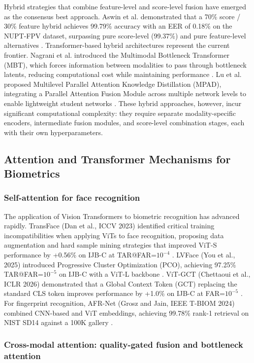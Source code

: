 \documentclass[10pt,journal,compsoc]{IEEEtran}
\begin{document}
Hybrid strategies that combine feature-level and score-level fusion have emerged as the consensus best approach. Aswin et al. demonstrated that a 70\% score / 30\% feature hybrid achieves 99.79\% accuracy with an EER of 0.18\% on the NUPT-FPV dataset, surpassing pure score-level (99.37\%) and pure feature-level alternatives \cite{REF3}. Transformer-based hybrid architectures represent the current frontier. Nagrani et al. introduced the Multimodal Bottleneck Transformer (MBT), which forces information between modalities to pass through bottleneck latents, reducing computational cost while maintaining performance \cite{REF106}. Lu et al. proposed Multilevel Parallel Attention Knowledge Distillation (MPAD), integrating a Parallel Attention Fusion Module across multiple network levels to enable lightweight student networks \cite{REF54}. These hybrid approaches, however, incur significant computational complexity: they require separate modality-specific encoders, intermediate fusion modules, and score-level combination stages, each with their own hyperparameters.

\subsection{Attention and Transformer Mechanisms for Biometrics}

\subsubsection{Self-attention for face recognition}

The application of Vision Transformers to biometric recognition has advanced rapidly. TransFace (Dan et al., ICCV 2023) identified critical training incompatibilities when applying ViTs to face recognition, proposing data augmentation and hard sample mining strategies that improved ViT-S performance by +0.56\% on IJB-C at TAR@FAR=$10^{-4}$ \cite{REF2}. LVFace (You et al., 2025) introduced Progressive Cluster Optimization (PCO), achieving 97.25\% TAR@FAR=$10^{-5}$ on IJB-C with a ViT-L backbone \cite{REF3}. ViT-GCT (Chettaoui et al., ICLR 2026) demonstrated that a Global Context Token (GCT) replacing the standard CLS token improves performance by +1.0\% on IJB-C at FAR=$10^{-5}$ \cite{REF4}. For fingerprint recognition, AFR-Net (Grosz and Jain, IEEE T-BIOM 2024) combined CNN-based and ViT embeddings, achieving 99.78\% rank-1 retrieval on NIST SD14 against a 100K gallery \cite{REF9}.

\subsubsection{Cross-modal attention: quality-gated fusion and bottleneck attention}
\end{document}
